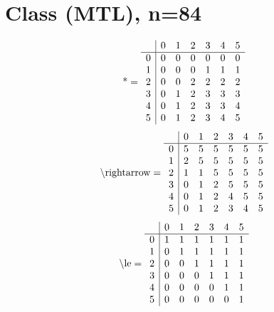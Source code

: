 \documentclass[11pt]{article}
\begin{document}
\section{Class (MTL), n=84}
\[\text{*} = 
\begin{array}{r | r r r r r r}
 & 0 & 1 & 2 & 3 & 4 & 5 \\ \hline
0 & 0 & 0 & 0 & 0 & 0 & 0 \\
1 & 0 & 0 & 0 & 1 & 1 & 1 \\
2 & 0 & 0 & 2 & 2 & 2 & 2 \\
3 & 0 & 1 & 2 & 3 & 3 & 3 \\
4 & 0 & 1 & 2 & 3 & 3 & 4 \\
5 & 0 & 1 & 2 & 3 & 4 & 5 \\
\end{array}
\]
\[\text{\textbackslash rightarrow} = 
\begin{array}{r | r r r r r r}
 & 0 & 1 & 2 & 3 & 4 & 5 \\ \hline
0 & 5 & 5 & 5 & 5 & 5 & 5 \\
1 & 2 & 5 & 5 & 5 & 5 & 5 \\
2 & 1 & 1 & 5 & 5 & 5 & 5 \\
3 & 0 & 1 & 2 & 5 & 5 & 5 \\
4 & 0 & 1 & 2 & 4 & 5 & 5 \\
5 & 0 & 1 & 2 & 3 & 4 & 5 \\
\end{array}
\]
\[\text{\textbackslash le} = 
\begin{array}{r | r r r r r r}
 & 0 & 1 & 2 & 3 & 4 & 5 \\ \hline
0 & 1 & 1 & 1 & 1 & 1 & 1 \\
1 & 0 & 1 & 1 & 1 & 1 & 1 \\
2 & 0 & 0 & 1 & 1 & 1 & 1 \\
3 & 0 & 0 & 0 & 1 & 1 & 1 \\
4 & 0 & 0 & 0 & 0 & 1 & 1 \\
5 & 0 & 0 & 0 & 0 & 0 & 1 \\
\end{array}
\]
\end{document}
